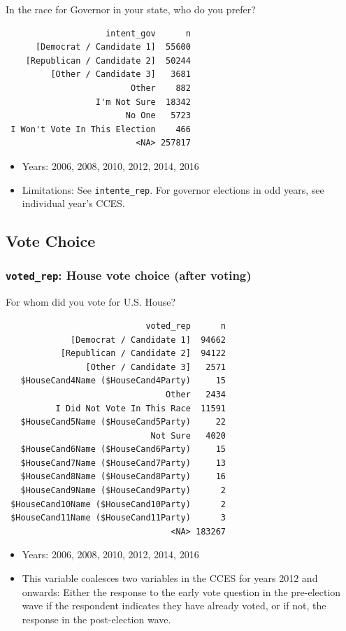 \documentclass[10pt,article,oneside]{memoir}
\theoremstyle{definition}
\begin{document}
In the race for Governor in your state, who do you prefer?

\begin{verbatim}
                    intent_gov      n
      [Democrat / Candidate 1]  55600
    [Republican / Candidate 2]  50244
         [Other / Candidate 3]   3681
                         Other    882
                  I'm Not Sure  18342
                        No One   5723
 I Won't Vote In This Election    466
                          <NA> 257817
\end{verbatim}

\begin{itemize}
\tightlist
\item
  Years: 2006, 2008, 2010, 2012, 2014, 2016
\item
  Limitations: See \texttt{intente\_rep}. For governor elections in odd
  years, see individual year's CCES.
\end{itemize}

\subsection{Vote Choice}\label{vote-choice}

\subsubsection{\texorpdfstring{\texttt{voted\_rep}: House vote choice
(after
voting)}{voted\_rep: House vote choice (after voting)}}\label{voted_rep-house-vote-choice-after-voting}

For whom did you vote for U.S. House?

\begin{verbatim}
                            voted_rep      n
             [Democrat / Candidate 1]  94662
           [Republican / Candidate 2]  94122
                [Other / Candidate 3]   2571
   $HouseCand4Name ($HouseCand4Party)     15
                                Other   2434
          I Did Not Vote In This Race  11591
   $HouseCand5Name ($HouseCand5Party)     22
                             Not Sure   4020
   $HouseCand6Name ($HouseCand6Party)     15
   $HouseCand7Name ($HouseCand7Party)     13
   $HouseCand8Name ($HouseCand8Party)     16
   $HouseCand9Name ($HouseCand9Party)      2
 $HouseCand10Name ($HouseCand10Party)      2
 $HouseCand11Name ($HouseCand11Party)      3
                                 <NA> 183267
\end{verbatim}

\begin{itemize}
\tightlist
\item
  Years: 2006, 2008, 2010, 2012, 2014, 2016
\item
  This variable coalesces two variables in the CCES for years 2012 and
  onwards: Either the response to the early vote question in the
  pre-election wave if the respondent indicates they have already voted,
  or if not, the response in the post-election wave.
\end{itemize}
\end{document}
